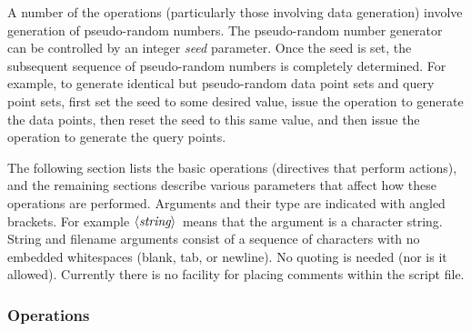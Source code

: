 \documentclass[11pt]{article}		%
\newcommand\ang[1]{\langle #1\rangle}
\newcommand{\STRING}[0]{$\ang{\textit{string}\/}$}
\begin{document}
A number of the operations (particularly those involving data generation)
involve generation of pseudo-random numbers.  The pseudo-random number
generator can be controlled by an integer \emph{seed} parameter.  Once
the seed is set, the subsequent sequence of pseudo-random numbers is
completely determined.  For example, to generate identical but pseudo-random
data point sets and query point sets, first set the seed to some desired
value, issue the operation to generate the data points, then reset the
seed to this same value, and then issue the operation to generate the
query points.

The following section lists the basic operations (directives that perform
actions), and the remaining sections describe various parameters that
affect how these operations are performed.  Arguments and their type are
indicated with angled brackets.  For example \STRING\ means that the
argument is a character string.  String and filename arguments consist
of a sequence of characters with no embedded whitespaces (blank, tab,
or newline).  No quoting is needed (nor is it allowed).  Currently there
is no facility for placing comments within the script file.

\subsubsection{Operations}
\end{document}

